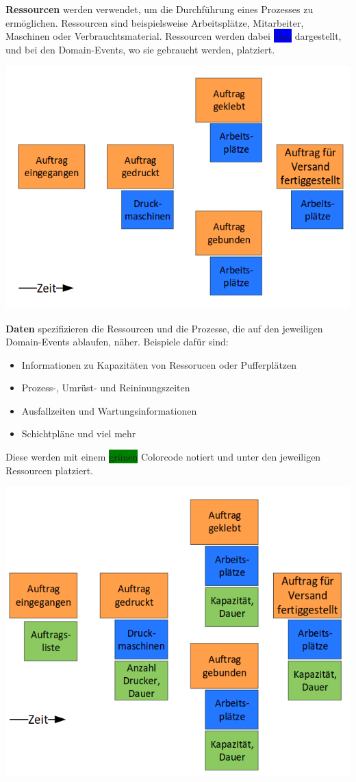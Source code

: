 \item \textbf{Ressourcen} werden verwendet, um die Durchführung eines Prozesses zu ermöglichen. Ressourcen sind beispielsweise Arbeitsplätze, Mitarbeiter, Maschinen oder Verbrauchtsmaterial. Ressourcen werden dabei \colorbox{blue}{\color{white}blau} dargestellt, und bei den Domain-Events, wo sie gebraucht werden, platziert.



\begin{minipage}[t]{1\textwidth}
    \centering
	\includegraphics[width=0.6\linewidth]{images/ressourcen.png}
\end{minipage}



\item \textbf{Daten} spezifizieren die Ressourcen und die Prozesse, die auf den jeweiligen Domain-Events ablaufen, näher. Beispiele dafür sind:
\begin{itemize}
    \item Informationen zu Kapazitäten von Ressorucen oder Pufferplätzen
    \item Prozess-, Umrüst- und Reininungszeiten
    \item Ausfallzeiten und Wartungsinformationen
    \item Schichtpläne und viel mehr
\end{itemize}
Diese werden mit einem \colorbox{green}{grünen} Colorcode notiert und unter den jeweiligen Ressourcen platziert.

\begin{minipage}[t]{1\textwidth}
    \centering
	\includegraphics[width=0.6\linewidth]{images/daten.png}
\end{minipage}

